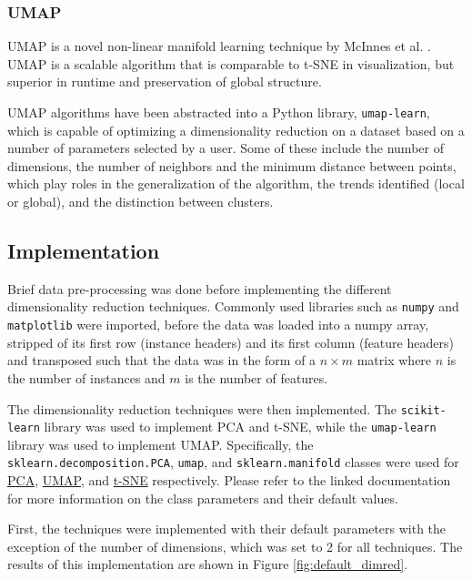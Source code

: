 \documentclass[12pt]{article}
\begin{document}
\subsubsection{UMAP}
UMAP is a novel non-linear manifold learning technique by McInnes et al. \cite{mcinnes_umap_2020}. UMAP is a scalable algorithm that is comparable to t-SNE in visualization, but superior in runtime and preservation of global structure.

UMAP algorithms have been abstracted into a Python library, \verb|umap-learn|, which is capable of optimizing a dimensionality reduction on a dataset based on a number of parameters selected by a user. Some of these include the number of dimensions, the number of neighbors and the minimum distance between points, which play roles in the generalization of the algorithm, the trends identified (local or global), and the distinction between clusters.

\subsection{Implementation}
Brief data pre-processing was done before implementing the different dimensionality reduction techniques. Commonly used libraries such as \verb|numpy| and \verb|matplotlib| were imported, before the data was loaded into a numpy array, stripped of its first row (instance headers) and its first column (feature headers) and transposed such that the data was in the form of a $n \times m$ matrix where $n$ is the number of instances and $m$ is the number of features.

The dimensionality reduction techniques were then implemented. The \verb|scikit-learn| library was used to implement PCA and t-SNE, while the \verb|umap-learn| library was used to implement UMAP. Specifically, the \verb|sklearn.decomposition.PCA|, \verb|umap|, and \verb|sklearn.manifold| classes were used for \href{https://scikit-learn.org/stable/modules/generated/sklearn.decomposition.PCA.html}{PCA}, \href{https://umap-learn.readthedocs.io/en/latest/parameters.html}{UMAP}, and \href{https://scikit-learn.org/stable/modules/generated/sklearn.manifold.TSNE.html}{t-SNE} respectively. Please refer to the linked documentation for more information on the class parameters and their default values.

First, the techniques were implemented with their default parameters with the exception of the number of dimensions, which was set to 2 for all techniques. The results of this implementation are shown in Figure \ref{fig:default_dimred}.
\end{document}
